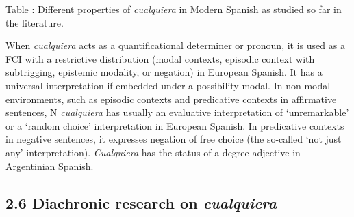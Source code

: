 \begin{styletablecaption}
Table : Different properties of \textit{cualquiera} in Modern Spanish as studied so far in the literature.
\end{styletablecaption}

\begin{styleStandard}
When \textit{cualquiera} acts as a quantificational determiner or pronoun, it is used as a FCI with a restrictive distribution (modal contexts, episodic context with subtrigging, epistemic modality, or negation) in European Spanish. It has a universal interpretation if embedded under a possibility modal. In non-modal environments, such as episodic contexts and predicative contexts in affirmative sentences, N \textit{cualquiera} has usually an evaluative interpretation of ‘unremarkable’ or a ‘random choice’ interpretation in European Spanish. In predicative contexts in negative sentences, it expresses negation of free choice (the so-called ‘not just any’ interpretation). \textit{Cualquiera} has the status of a degree adjective in Argentinian Spanish.
\end{styleStandard}

\subsection[2.6 Diachronic research on cualquiera]{\textbf{2.6 Diachronic research on }\textbf{\textit{cualquiera}}}
